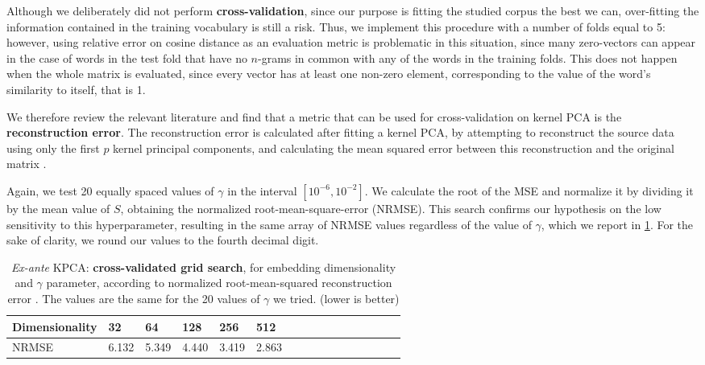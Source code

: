 
Although we deliberately did not perform \textbf{cross-validation}, since our purpose is fitting the studied corpus the best we can, over-fitting the information contained in the training vocabulary is still a risk. Thus, we implement this procedure with a number of folds equal to 5: however, using relative error on cosine distance as an evaluation metric is problematic in this situation, since many zero-vectors can appear in the case of words in the test fold that have no $n$-grams in common with any of the words in the training folds. This does not happen when the whole matrix is evaluated, since every vector has at least one non-zero element, corresponding to the value of the word's similarity to itself, that is 1.

We therefore review the relevant literature and find \cite{alam_hyperparameter_2014} that a metric that can be used for cross-validation on kernel PCA is the \textbf{reconstruction error}.
The reconstruction error is calculated after fitting a kernel PCA, by attempting to reconstruct the source data using only the first $p$ kernel principal components, and calculating the mean squared error between this reconstruction and the original matrix \cite{mika_fisher_1999}.

Again, we test 20 equally spaced values of $\gamma$ in the interval $[10^{-6}, 10^{-2}]$.
We calculate the root of the MSE and normalize it by dividing it by the mean value of $S$, obtaining the normalized root-mean-square-error (NRMSE).
This search confirms our hypothesis on the low sensitivity to this hyperparameter, resulting in the same array of NRMSE values regardless of the value of $\gamma$, which we report in \cref{table:nmrse-pre}.
For the sake of clarity, we round our values to the fourth decimal digit.


\begin{table}[h!]

\centering

\begin{tabular}{|l|l|l|l|l|l|l|l|l|l|l|l|l|l|l|l|}
\hline
\rowcolor[HTML]{C0C0C0} 
Dimensionality & 32 & 64 & 128 & 256 & 512 \\ \hline
NRMSE & 6.132 & 5.349 & 4.440 & 3.419 & 2.863 \\ \hline
\end{tabular}
\caption{\textit{Ex-ante} KPCA: \textbf{cross-validated grid search}, for embedding dimensionality and $\gamma$ parameter, according to normalized root-mean-squared reconstruction error . The values are the same for the 20 values of $\gamma$ we tried. (lower is better)}
\label{table:nmrse-pre}
\end{table}
 
